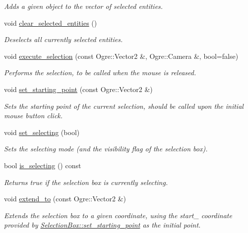 \begin{DoxyCompactItemize}
\begin{DoxyCompactList}\small\item\em Adds a given object to the vector of selected entities. \end{DoxyCompactList}\item 
void \hyperlink{class_selection_box_aae870741250f1247633a76d7343114e1}{clear\+\_\+selected\+\_\+entities} ()
\begin{DoxyCompactList}\small\item\em Deselects all currently selected entities. \end{DoxyCompactList}\item 
void \hyperlink{class_selection_box_a8013255ab23d92e60bb28378e837421a}{execute\+\_\+selection} (const Ogre\+::\+Vector2 \&, Ogre\+::\+Camera \&, bool=false)
\begin{DoxyCompactList}\small\item\em Performs the selection, to be called when the mouse is released. \end{DoxyCompactList}\item 
void \hyperlink{class_selection_box_aa9f4cbe292d3386e212495e8e31d5f40}{set\+\_\+starting\+\_\+point} (const Ogre\+::\+Vector2 \&)
\begin{DoxyCompactList}\small\item\em Sets the starting point of the current selection, should be called upon the initial mouse button click. \end{DoxyCompactList}\item 
void \hyperlink{class_selection_box_a135517752479cff0bb5bf32ed9b5277b}{set\+\_\+selecting} (bool)
\begin{DoxyCompactList}\small\item\em Sets the selecting mode (and the visibility flag of the selection box). \end{DoxyCompactList}\item 
bool \hyperlink{class_selection_box_ab8e28df20f6f27f40512cd32d7f9b047}{is\+\_\+selecting} () const 
\begin{DoxyCompactList}\small\item\em Returns true if the selection box is currently selecting. \end{DoxyCompactList}\item 
void \hyperlink{class_selection_box_a7bfb19cdb0c9c999784e1af6cd352fc8}{extend\+\_\+to} (const Ogre\+::\+Vector2 \&)
\begin{DoxyCompactList}\small\item\em Extends the selection box to a given coordinate, using the start\+\_\+ coordinate provided by \hyperlink{class_selection_box_aa9f4cbe292d3386e212495e8e31d5f40}{Selection\+Box\+::set\+\_\+starting\+\_\+point} as the initial point. \end{DoxyCompactList}\end{DoxyCompactItemize}
